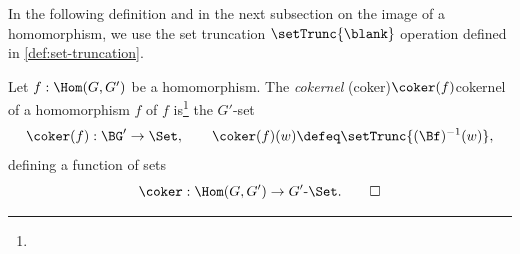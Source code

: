 In the following definition and in the next subsection on the image
of a homomorphism, we use the set truncation $\setTrunc{\blank}$
operation defined in \cref{def:set-truncation}.

\begin{definition}
  \label{def:cokernel}
  Let $f:\Hom(G,G')$  be a homomorphism.
  The \emph{cokernel}%
  \glossary(coker){$\protect\coker(f)$}{cokernel of a homomorphism $f$}
  of $f$ is\footnote{%
}
the $G'$-set
\[
  \coker(f):\BG'\to\Set,\qquad \coker(f)(w)\defeq\setTrunc{(\Bf)^{-1}(w)},
\]
defining a function of sets
\[
  \coker:\Hom(G,G')\to G'\text{-}\Set.\qedhere
\]
\end{definition}

